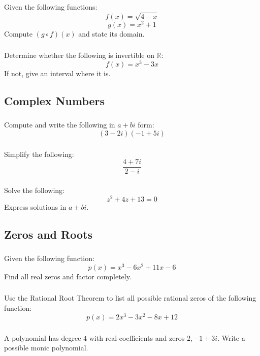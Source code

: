 \documentclass[12pt]{article}
\begin{document}
			\subsubsection{}
				Given the following functions:
				\[f(x)=\sqrt{4-x}\]
				\[g(x)=x^2+1\]
				Compute \(\left(g\circ f\right)\left(x\right)\) and state its domain.
			\subsubsection{}
				Determine whether the following is invertible on \(\mathbb{R}\):
				\[f(x)=x^3-3x\]
				If not, give an interval where it is.

		\subsection{Complex Numbers}
			\subsubsection{}
				Compute and write the following in \(a+bi\) form:
				\[(3-2i)(-1+5i)\]
			\subsubsection{}
				Simplify the following:
				\[\frac{4+7i}{2- i}\]
			\subsubsection{}
				Solve the following:
				\[z^2+4z+13=0\]
				Express solutions in \(a\pm bi\).

		\subsection{Zeros and Roots}
			\subsubsection{}
				Given the following function:
				\[p(x)=x^3-6x^2+11x-6\]
				Find all real zeros and factor completely.
			\subsubsection{}
				Use the Rational Root Theorem to list all possible rational zeros of the following function:
				\[p(x)=2x^3-3x^2-8x+12\]
			\subsubsection{}
				A polynomial has degree \(4\) with real coefficients and zeros \(2,-1+3i\). Write a possible monic polynomial.
\end{document}
